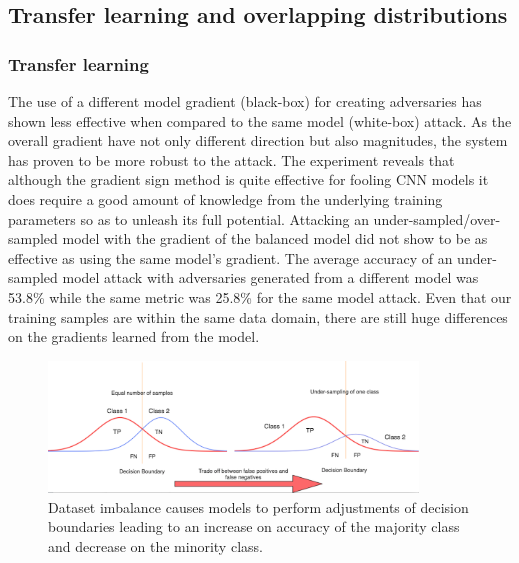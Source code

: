 \documentclass[runningheads,a4paper]{llncs}
\begin{document}
\subsection{Transfer learning and overlapping distributions}

\subsubsection{Transfer learning} The use of a different model gradient (black-box) for creating adversaries has shown less effective when compared to the same model (white-box) attack. As the overall gradient have not only different direction but also magnitudes, the system has proven to be more robust to the attack. The experiment reveals that although the gradient sign method is quite effective for fooling CNN models it does require a good amount of knowledge from the underlying training parameters so as to unleash its full potential. Attacking an under-sampled/over-sampled model with the gradient of the balanced model did not show to be as effective as using the same model's gradient. The average accuracy of an under-sampled model attack with adversaries generated from a different model was 53.8\% while the same metric was 25.8\% for the same model attack. Even that our training samples are within the same data domain, there are still huge differences on the gradients learned from the model. 
\begin{figure}
	\centering
	\includegraphics[height=3.5cm]{class_dist.png}
	\caption{Dataset imbalance causes models to perform adjustments of decision boundaries leading to an increase on accuracy of the majority class and decrease on the minority class.}
	\label{fig:class_dist}
\end{figure}
\end{document}
